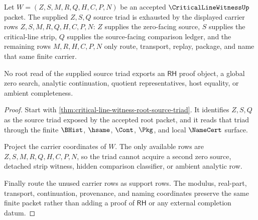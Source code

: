 \begin{theorem}
\label{thm:critical-line-witness-supplied-source-carrier-triad-exhaustion}
Let $W=(Z,S,M,R,Q,H,C,P,N)$ be an accepted $\CriticalLineWitnessUp$ packet. The supplied $Z,S,Q$ source triad is exhausted by the displayed carrier rows $Z,S,M,R,Q,H,C,P,N$: $Z$ supplies the zero-facing source, $S$ supplies the critical-line strip, $Q$ supplies the source-facing comparison ledger, and the remaining rows $M,R,H,C,P,N$ only route, transport, replay, package, and name that same finite carrier.

No root read of the supplied source triad exports an $\mathsf{RH}$ proof object, a global zero search, analytic continuation, quotient representatives, host equality, or ambient completeness.
\end{theorem}
\begin{proof}
Start with \autoref{thm:critical-line-witness-root-source-triad}. It identifies $Z,S,Q$ as the source triad exposed by the accepted root packet, and it reads that triad through the finite $\BHist$, $\hsame$, $\Cont$, $\Pkg$, and local $\NameCert$ surface.

Project the carrier coordinates of $W$. The only available rows are $Z,S,M,R,Q,H,C,P,N$, so the triad cannot acquire a second zero source, detached strip witness, hidden comparison classifier, or ambient analytic row.

Finally route the unused carrier rows as support rows. The modulus, real-part, transport, continuation, provenance, and naming coordinates preserve the same finite packet rather than adding a proof of $\mathsf{RH}$ or any external completion datum.
\end{proof}

